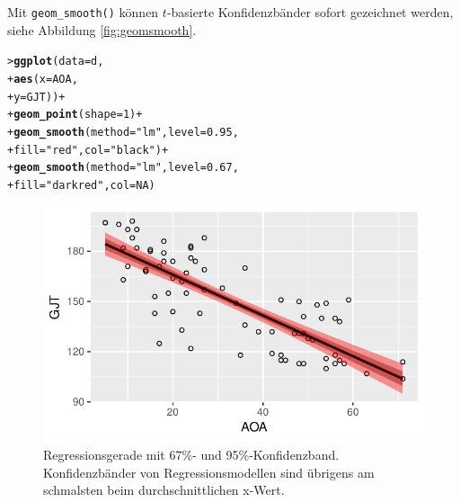 \documentclass[oneside, 10pt]{book}\usepackage[]{graphicx}\usepackage[]{xcolor}
\makeatletter
\newcommand{\hlnum}[1]{\textcolor[rgb]{0.686,0.059,0.569}{#1}}%
\newcommand{\hlstr}[1]{\textcolor[rgb]{0.192,0.494,0.8}{#1}}%
\newcommand{\hlopt}[1]{\textcolor[rgb]{0,0,0}{#1}}%
\newcommand{\hlstd}[1]{\textcolor[rgb]{0.345,0.345,0.345}{#1}}%
\newcommand{\hlkwc}[1]{\textcolor[rgb]{0.333,0.667,0.333}{#1}}%
\newcommand{\hlkwd}[1]{\textcolor[rgb]{0.737,0.353,0.396}{\textbf{#1}}}%
\newenvironment{kframe}{%
 \def\at@end@of@kframe{}%
 \ifinner\ifhmode%
  \def\at@end@of@kframe{\end{minipage}}%
  \begin{minipage}{\columnwidth}%
 \fi\fi%
 \def\FrameCommand##1{\hskip\@totalleftmargin \hskip-\fboxsep
 \colorbox{shadecolor}{##1}\hskip-\fboxsep
     \hskip-\linewidth \hskip-\@totalleftmargin \hskip\columnwidth}%
 \MakeFramed {\advance\hsize-\width
   \@totalleftmargin\z@ \linewidth\hsize
   \@setminipage}}%
 {\par\unskip\endMakeFramed%
 \at@end@of@kframe}
\newenvironment{knitrout}{}{} %
\makeatother
\begin{document}
Mit \texttt{geom\_smooth()} können $t$-basierte Konfidenzbänder
sofort gezeichnet werden, siehe Abbildung \ref{fig:geomsmooth}.
\begin{knitrout}
\color{fgcolor}\begin{kframe}
\begin{alltt}
\hlstd{> }\hlkwd{ggplot}\hlstd{(}\hlkwc{data} \hlstd{= d,}
\hlstd{+ }       \hlkwd{aes}\hlstd{(}\hlkwc{x} \hlstd{= AOA,}
\hlstd{+ }           \hlkwc{y} \hlstd{= GJT))} \hlopt{+}
\hlstd{+ }  \hlkwd{geom_point}\hlstd{(}\hlkwc{shape} \hlstd{=} \hlnum{1}\hlstd{)} \hlopt{+}
\hlstd{+ }  \hlkwd{geom_smooth}\hlstd{(}\hlkwc{method} \hlstd{=} \hlstr{"lm"}\hlstd{,} \hlkwc{level} \hlstd{=} \hlnum{0.95}\hlstd{,}
\hlstd{+ }              \hlkwc{fill} \hlstd{=} \hlstr{"red"}\hlstd{,} \hlkwc{col} \hlstd{=} \hlstr{"black"}\hlstd{)} \hlopt{+}
\hlstd{+ }  \hlkwd{geom_smooth}\hlstd{(}\hlkwc{method} \hlstd{=} \hlstr{"lm"}\hlstd{,} \hlkwc{level} \hlstd{=} \hlnum{0.67}\hlstd{,}
\hlstd{+ }              \hlkwc{fill} \hlstd{=} \hlstr{"darkred"}\hlstd{,} \hlkwc{col} \hlstd{=} \hlnum{NA}\hlstd{)}
\end{alltt}
\end{kframe}\begin{figure}[tp]

{\centering \includegraphics[width=.7\textwidth]{figs/unnamed-chunk-226-1} 

}

\caption{Regressionsgerade mit 67\%- und 95\%-Konfidenzband. Konfidenzbänder von Regressionsmodellen sind übrigens am schmalsten beim durchschnittlichen x-Wert.\label{fig:geomsmooth}}\label{fig:unnamed-chunk-226}
\end{figure}

\end{knitrout}
\end{document}
